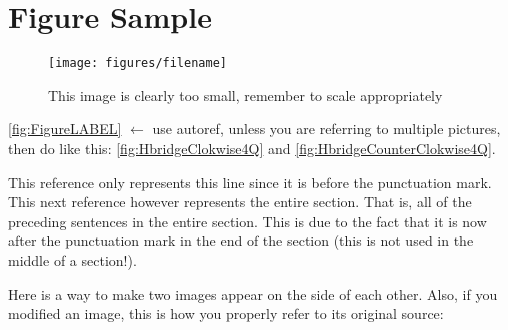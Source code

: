 \chapter{Figure Sample}

\begin{figure}[H]                                         %
  \texttt{[image: figures/filename]}  %
  \caption{This image is clearly too small, remember to scale appropriately }
  \label{fig:FigureLABEL}  %
\end{figure}               %


\autoref{fig:FigureLABEL} $\leftarrow$ use autoref, unless you are referring to multiple pictures, then do like this: \autoref{fig:HbridgeClokwise4Q} and \ref{fig:HbridgeCounterClokwise4Q}.

\vspace{.5cm}
\noindent
%
This reference only represents this line since it is before the punctuation mark\cite{YDing}. This next reference however represents the entire section. That is, all of the preceding sentences in the entire section. This is due to the fact that it is now after the punctuation mark in the end of the section (this is not used in the middle of a section!).\cite{YDing}


Here is a way to make two images appear on the side of each other. Also, if you modified an image, this is how you properly refer to its original source:

